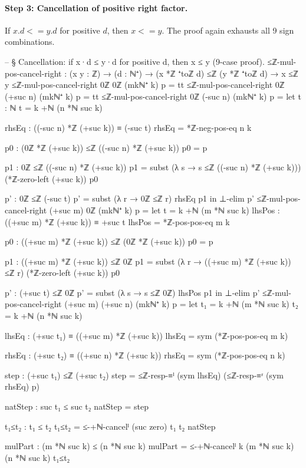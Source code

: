 \documentclass[11pt,a4paper]{book}
\def\cdot{.}%
\def\leq{<=}%
\begin{document}
\paragraph{Step 3: Cancellation of positive right factor.}
If $x \cdot d \leq y \cdot d$ for positive $d$, then $x \leq y$.
The proof again exhausts all 9 sign combinations.

\begin{code}
-- § Cancellation: if x·d ≤ y·d for positive d, then x ≤ y (9-case proof).
≤ℤ-mul-pos-cancel-right : (x y : ℤ) → (d : ℕ⁺) → (x *ℤ ⁺toℤ d) ≤ℤ (y *ℤ ⁺toℤ d) → x ≤ℤ y
≤ℤ-mul-pos-cancel-right 0ℤ 0ℤ (mkℕ⁺ k) p = tt
≤ℤ-mul-pos-cancel-right 0ℤ (+suc n) (mkℕ⁺ k) p = tt
≤ℤ-mul-pos-cancel-right 0ℤ (-suc n) (mkℕ⁺ k) p =
  let
    t : ℕ
    t = k +ℕ (n *ℕ suc k)

    rhsEq : ((-suc n) *ℤ (+suc k)) ≡ (-suc t)
    rhsEq = *ℤ-neg-pos-eq n k

    p0 : (0ℤ *ℤ (+suc k)) ≤ℤ ((-suc n) *ℤ (+suc k))
    p0 = p

    p1 : 0ℤ ≤ℤ ((-suc n) *ℤ (+suc k))
    p1 = subst (λ s → s ≤ℤ ((-suc n) *ℤ (+suc k))) (*ℤ-zero-left (+suc k)) p0

    p' : 0ℤ ≤ℤ (-suc t)
    p' = subst (λ r → 0ℤ ≤ℤ r) rhsEq p1
  in
  ⊥-elim p'
≤ℤ-mul-pos-cancel-right (+suc m) 0ℤ (mkℕ⁺ k) p =
  let
    t = k +ℕ (m *ℕ suc k)
    lhsPos : ((+suc m) *ℤ (+suc k)) ≡ +suc t
    lhsPos = *ℤ-pos-pos-eq m k

    p0 : ((+suc m) *ℤ (+suc k)) ≤ℤ (0ℤ *ℤ (+suc k))
    p0 = p

    p1 : ((+suc m) *ℤ (+suc k)) ≤ℤ 0ℤ
    p1 = subst (λ r → ((+suc m) *ℤ (+suc k)) ≤ℤ r) (*ℤ-zero-left (+suc k)) p0

    p' : (+suc t) ≤ℤ 0ℤ
    p' = subst (λ s → s ≤ℤ 0ℤ) lhsPos p1
  in
  ⊥-elim p'
≤ℤ-mul-pos-cancel-right (+suc m) (+suc n) (mkℕ⁺ k) p =
  let
    t₁ = k +ℕ (m *ℕ suc k)
    t₂ = k +ℕ (n *ℕ suc k)

    lhsEq : (+suc t₁) ≡ ((+suc m) *ℤ (+suc k))
    lhsEq = sym (*ℤ-pos-pos-eq m k)

    rhsEq : (+suc t₂) ≡ ((+suc n) *ℤ (+suc k))
    rhsEq = sym (*ℤ-pos-pos-eq n k)

    step : (+suc t₁) ≤ℤ (+suc t₂)
    step =
      ≤ℤ-resp-≡ˡ (sym lhsEq)
        (≤ℤ-resp-≡ʳ (sym rhsEq) p)

    natStep : suc t₁ ≤ suc t₂
    natStep = step

    t₁≤t₂ : t₁ ≤ t₂
    t₁≤t₂ = ≤-+ℕ-cancelˡ (suc zero) t₁ t₂ natStep

    mulPart : (m *ℕ suc k) ≤ (n *ℕ suc k)
    mulPart = ≤-+ℕ-cancelˡ k (m *ℕ suc k) (n *ℕ suc k) t₁≤t₂


\end{code}
\end{document}

